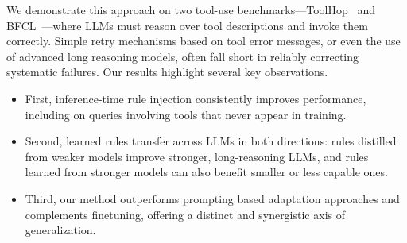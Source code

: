 
We demonstrate this approach on two tool-use benchmarks—ToolHop~\citep{ye2025toolhop} and BFCL~\citep{berkeley-function-calling-leaderboard}—where LLMs must reason over tool descriptions and invoke them correctly. Simple retry mechanisms based on tool error messages, or even the use of advanced long reasoning models, often fall short in reliably correcting systematic failures.
Our results highlight several key observations. 
\begin{itemize}
    \item First, inference-time rule injection consistently improves performance, including on queries involving tools that never appear in training.%
    \item Second, learned rules transfer across LLMs in both directions: rules distilled from weaker models improve stronger, long-reasoning LLMs, and rules learned from stronger models can also benefit smaller or less capable ones.
    \item Third, our method outperforms prompting based adaptation approaches and complements finetuning, offering a distinct and synergistic axis of generalization. 
\end{itemize}




